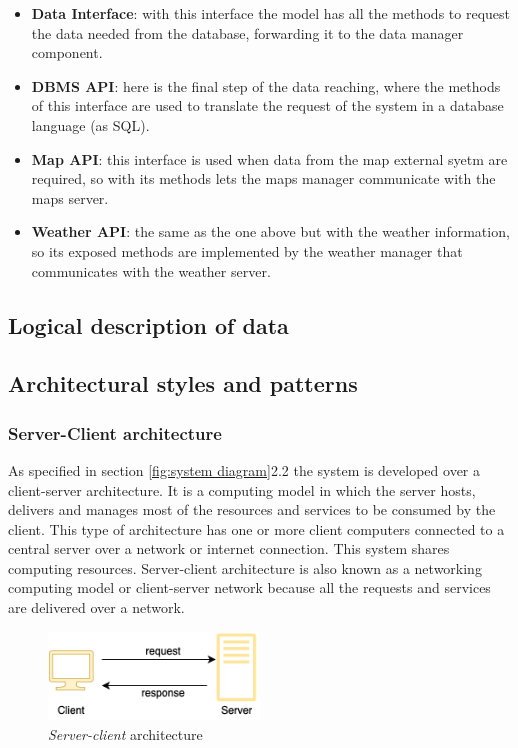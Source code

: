 \begin{itemize}
    \item \textbf{Data Interface}: with this interface the model has all the methods to request the data needed from the database, forwarding it to the data manager component. 
    \item \textbf{DBMS API}: here is the final step of the data reaching, where the methods of this interface are used to translate the request of the system in a database language (as SQL).
    \item \textbf{Map API}: this interface is used when data from the map external syetm are required, so with its methods lets the maps manager communicate with the maps server.
    \item \textbf{Weather API}: the same as the one above but with the weather information, so its exposed methods are implemented by the weather manager that communicates with the weather server.
\end{itemize}
\subsection{Logical description of data}



\subsection{Architectural styles and patterns}

\subsubsection{Server-Client architecture}
As specified in section \ref{fig:system diagram}{2.2} the system is developed over a client-server architecture. It is a computing model in which the server hosts, delivers and manages most of the resources and services to be consumed by the client. This type of architecture has one or more client computers connected to a central server over a network or internet connection. This system shares computing resources. Server-client architecture is also known as a networking computing model or client-server network because all the requests and services are delivered over a network.
\begin{figure}[H]
    \begin{center}
    \includegraphics[width=0.5\textwidth]{images/client-server.png}
    \caption{\emph{Server-client} architecture}
    \label{fig:client-server}
    \end{center}
\end{figure}

